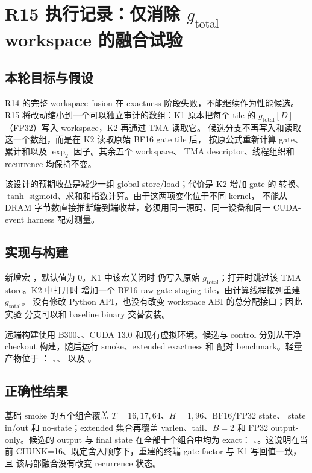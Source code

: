 \section{R15 执行记录：仅消除 $g_{\mathrm{total}}$ workspace 的融合试验}

\subsection{本轮目标与假设}

R14 的完整 workspace fusion 在 exactness 阶段失败，不能继续作为性能候选。
R15 将改动缩小到一个可以独立审计的数组：K1 原本把每个 tile 的
\(g_{\mathrm{total}}[D]\)（FP32）写入 workspace，K2 再通过 TMA 读取它。
候选分支不再写入和读取这一个数组，而是在 K2 读取原始 BF16 gate tile 后，
按原公式重新计算 gate、累计和以及 \(\exp_2\) 因子。其余五个 workspace、
TMA descriptor、线程组织和 recurrence 均保持不变。

该设计的预期收益是减少一组 global store/load；代价是 K2 增加 gate 的
转换、\(\tanh\) sigmoid、求和和指数计算。由于这两项变化位于不同 kernel，
不能从 DRAM 字节数直接推断端到端收益，必须用同一源码、同一设备和同一
CUDA-event harness 配对测量。

\subsection{实现与构建}

新增宏 ，默认值为 0。K1 中该宏关闭时
仍写入原始 \(g_{\mathrm{total}}\)；打开时跳过该 TMA store。K2 中打开时
增加一个 BF16 raw-gate staging tile，由计算线程按列重建 \(g_{\mathrm{total}}\)。
没有修改 Python API，也没有改变 workspace ABI 的总分配接口；因此实验
分支可以和 baseline binary 交替安装。

远端构建使用 B300、、CUDA 13.0 和现有虚拟环境。候选与
control 分别从干净 checkout 构建，随后运行 smoke、extended exactness 和
配对 benchmark。轻量产物位于 ：
、、
 以及
。

\subsection{正确性结果}

基础 smoke 的五个组合覆盖 \(T=16,17,64\)、\(H=1,96\)、BF16/FP32 state、
state in/out 和 no-state；extended 集合再覆盖 varlen、tail、\(B=2\) 和
FP32 output-only。候选的 output 与 final state 在全部十个组合中均为 exact：
、。这说明在当前
CHUNK=16、既定舍入顺序下，重建的终端 gate factor 与 K1 写回值一致，且
该局部融合没有改变 recurrence 状态。

